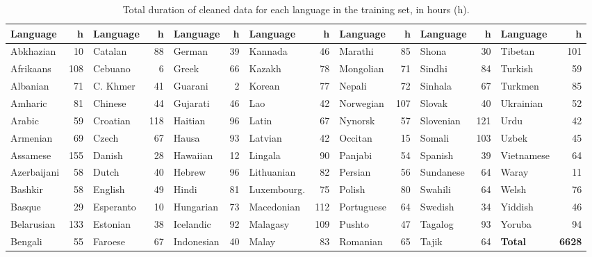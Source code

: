 \documentclass{article}
\begin{document}
\begin{table*}[tbh]
\footnotesize
\caption{Total duration of cleaned data for each language in the training set, in hours (h).}
\label{tab:durs}
\centering
\begin{tabular}{lr|lr|lr|lr|lr|lr|lr}
\hline
Language    & h & Language  & h & Language    & h & Language      & h & Language   & h & Language  & h & Language   & h \\
\hline
Abkhazian   & 10    & Catalan   & 88    & German      & 39    & Kannada       & 46    & Marathi    & 85    & Shona     & 30    & Tibetan    & 101   \\
Afrikaans   & 108   & Cebuano   & 6     & Greek       & 66    & Kazakh        & 78    & Mongolian  & 71    & Sindhi    & 84    & Turkish    & 59    \\
Albanian    & 71    & C. Khmer  & 41    & Guarani     & 2     & Korean        & 77    & Nepali     & 72    & Sinhala   & 67    & Turkmen    & 85    \\
Amharic     & 81    & Chinese   & 44    & Gujarati    & 46    & Lao           & 42    & Norwegian  & 107   & Slovak    & 40    & Ukrainian  & 52    \\
Arabic      & 59    & Croatian  & 118   & Haitian     & 96    & Latin         & 67    & Nynorsk    & 57    & Slovenian & 121   & Urdu       & 42    \\
Armenian    & 69    & Czech     & 67    & Hausa       & 93    & Latvian       & 42    & Occitan    & 15    & Somali    & 103   & Uzbek      & 45    \\
Assamese    & 155   & Danish    & 28    & Hawaiian    & 12    & Lingala       & 90    & Panjabi    & 54    & Spanish   & 39    & Vietnamese & 64    \\
Azerbaijani & 58    & Dutch     & 40    & Hebrew      & 96    & Lithuanian    & 82    & Persian    & 56    & Sundanese & 64    & Waray      & 11    \\
Bashkir     & 58    & English   & 49    & Hindi       & 81    & Luxembourg. & 75    & Polish     & 80    & Swahili   & 64    & Welsh      & 76    \\
Basque      & 29    & Esperanto & 10    & Hungarian   & 73    & Macedonian    & 112   & Portuguese & 64    & Swedish   & 34    & Yiddish    & 46    \\
Belarusian  & 133   & Estonian  & 38    & Icelandic   & 92    & Malagasy      & 109   & Pushto     & 47    & Tagalog   & 93    & Yoruba     & 94    \\
Bengali     & 55    & Faroese   & 67    & Indonesian  & 40    & Malay         & 83    & Romanian   & 65    & Tajik     & 64    & \textbf{Total}      & \textbf{6628}  \\

\end{tabular}
\end{table*}
\end{document}

